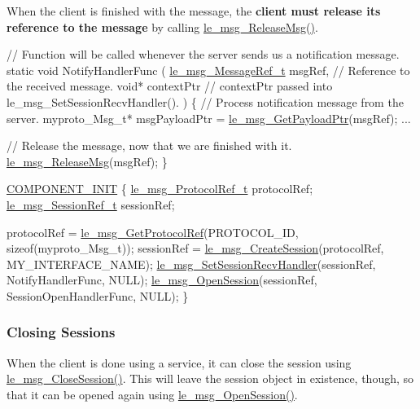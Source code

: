 When the client is finished with the message, the {\bfseries  client must release its reference to the message } by calling \hyperlink{le__messaging_8h_afc508c24d0b6933e8fbc4e0410d50271}{le\+\_\+msg\+\_\+\+Release\+Msg()}.


\begin{DoxyCode}
\textcolor{comment}{// Function will be called whenever the server sends us a notification message.}
\textcolor{keyword}{static} \textcolor{keywordtype}{void} NotifyHandlerFunc
(
    \hyperlink{le__messaging_8h_a1e5c37fdd50a4d6d24cad82cb166f770}{le\_msg\_MessageRef\_t}  msgRef,    \textcolor{comment}{// Reference to the received message.}
    \textcolor{keywordtype}{void}*                contextPtr \textcolor{comment}{// contextPtr passed into le\_msg\_SetSessionRecvHandler().}
)
\{
    \textcolor{comment}{// Process notification message from the server.}
    myproto\_Msg\_t* msgPayloadPtr = \hyperlink{le__messaging_8h_a32d1c7ffd913db8546f6f1bd5cce58c4}{le\_msg\_GetPayloadPtr}(msgRef);
    ...

    \textcolor{comment}{// Release the message, now that we are finished with it.}
    \hyperlink{le__messaging_8h_afc508c24d0b6933e8fbc4e0410d50271}{le\_msg\_ReleaseMsg}(msgRef);
\}

\hyperlink{le__event_loop_8h_abdb9187a56836a93d19cc793cbd4b7ec}{COMPONENT\_INIT}
\{
    \hyperlink{le__messaging_8h_ac05e9b3268f8fb5776adab6fe11410e5}{le\_msg\_ProtocolRef\_t} protocolRef;
    \hyperlink{le__messaging_8h_aebfc01e15b430a5b4f3038a5bd518904}{le\_msg\_SessionRef\_t} sessionRef;

    protocolRef = \hyperlink{le__messaging_8h_adcd1ff1a6906433aaa6d7038125c4473}{le\_msg\_GetProtocolRef}(PROTOCOL\_ID, \textcolor{keyword}{sizeof}(myproto\_Msg\_t));
    sessionRef = \hyperlink{le__messaging_8h_a696d7c2d4e3725d3ddb5dd2d79d2d732}{le\_msg\_CreateSession}(protocolRef, MY\_INTERFACE\_NAME);
    \hyperlink{le__messaging_8h_ac726cc93219d326e1b10a7d13a0f4f65}{le\_msg\_SetSessionRecvHandler}(sessionRef, NotifyHandlerFunc, NULL);
    \hyperlink{le__messaging_8h_a574d37960a07c4fc2bde310408619cff}{le\_msg\_OpenSession}(sessionRef, SessionOpenHandlerFunc, NULL);
\}
\end{DoxyCode}
\hypertarget{c_messaging_c_messagingClientClosing}{}\subsubsection{Closing Sessions}\label{c_messaging_c_messagingClientClosing}
When the client is done using a service, it can close the session using \hyperlink{le__messaging_8h_a1af0671de74160d99be5bfe212c39369}{le\+\_\+msg\+\_\+\+Close\+Session()}. This will leave the session object in existence, though, so that it can be opened again using \hyperlink{le__messaging_8h_a574d37960a07c4fc2bde310408619cff}{le\+\_\+msg\+\_\+\+Open\+Session()}.


